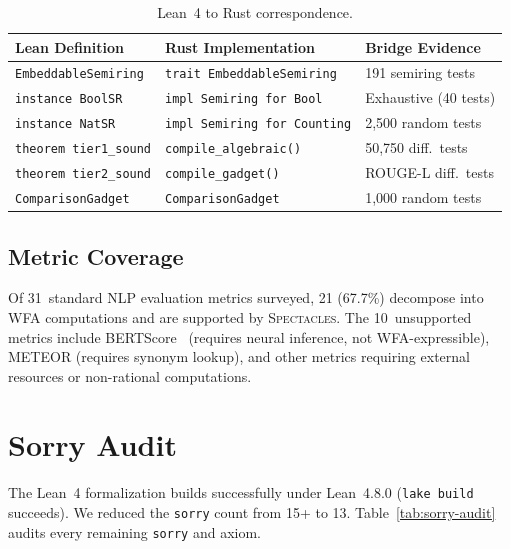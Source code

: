 \documentclass[11pt]{article}
\newcommand{\spectacles}{\textsc{Spectacles}}
\newcommand{\sorry}{\texttt{sorry}}
\begin{document}
\begin{table}[t]
\centering\small
\caption{Lean~4 to Rust correspondence.}\label{tab:correspondence}
\smallskip
\begin{tabular}{@{}p{2.8cm}p{3.4cm}p{3.0cm}@{}}
\toprule
\textbf{Lean Definition} & \textbf{Rust Implementation} & \textbf{Bridge Evidence} \\
\midrule
\texttt{EmbeddableSemiring} & \texttt{trait EmbeddableSemiring} & 191 semiring tests \\
\texttt{instance BoolSR} & \texttt{impl Semiring for Bool} & Exhaustive (40 tests) \\
\texttt{instance NatSR} & \texttt{impl Semiring for Counting} & 2{,}500 random tests \\
\texttt{theorem tier1\_sound} & \texttt{compile\_algebraic()} & 50{,}750 diff.\ tests \\
\texttt{theorem tier2\_sound} & \texttt{compile\_gadget()} & ROUGE-L diff.\ tests \\
\texttt{ComparisonGadget} & \texttt{ComparisonGadget} & 1{,}000 random tests \\
\bottomrule
\end{tabular}
\end{table}

\subsection{Metric Coverage}

Of 31~standard NLP evaluation metrics surveyed, 21 (67.7\%) decompose
into WFA computations and are supported by \spectacles{}.
The 10~unsupported metrics include BERTScore~\cite{zhang2020bertscore}
(requires neural inference, not WFA-expressible),
METEOR (requires synonym lookup), and other metrics requiring
external resources or non-rational computations.


\section{Sorry Audit}\label{sec:sorry-audit}

The Lean~4 formalization builds successfully under Lean~4.8.0
(\texttt{lake build} succeeds).
We reduced the \sorry{} count from 15+ to 13.
Table~\ref{tab:sorry-audit} audits every remaining \sorry{} and
axiom.
\end{document}
